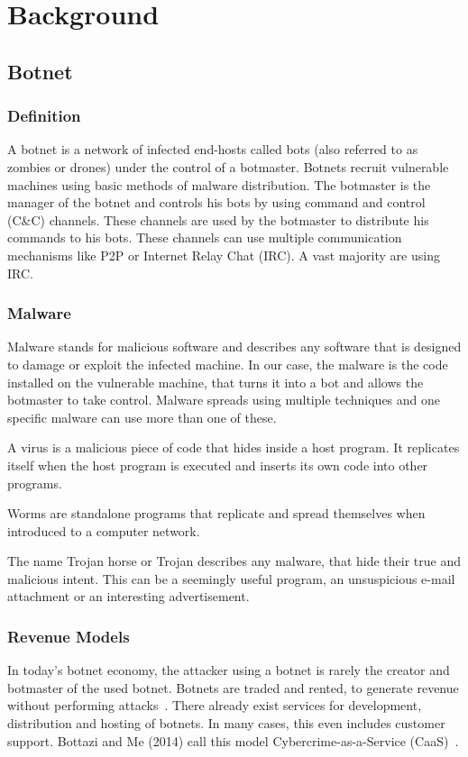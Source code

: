 \section{Background}
\subsection{Botnet}
\subsubsection{Definition}
A botnet is a network of infected end-hosts called bots (also referred to as zombies or drones) under the control of a botmaster.
Botnets recruit vulnerable machines using basic methods of malware distribution.
The botmaster is the manager of the botnet and controls his bots by using command and control (C\&C) channels.
These channels are used by the botmaster to distribute his commands to his bots.
These channels can use multiple communication mechanisms like P2P or Internet Relay Chat (IRC).
A vast majority are using IRC.\cite{AbuRajab06}

\subsubsection{Malware}
Malware stands for malicious software and describes any software that is designed to damage or exploit the infected machine.
In our case, the malware is the code installed on the vulnerable machine, that turns it into a bot and allows the botmaster to take control.
Malware spreads using multiple techniques and one specific malware can use more than one of these.

A virus is a malicious piece of code that hides inside a host program.
It replicates itself when the host program is executed and inserts its own code into other programs.

Worms are standalone programs that replicate and spread themselves when introduced to a computer network.

The name Trojan horse or Trojan describes any malware, that hide their true and malicious intent.
This can be a seemingly useful program, an unsuspicious e-mail attachment or an interesting advertisement.


\subsubsection{Revenue Models}
In today's botnet economy, the attacker using a botnet is rarely the creator and botmaster of the used botnet.
Botnets are traded and rented, to generate revenue without performing attacks~\cite{Li09}.
There already exist services for development, distribution and hosting of botnets.
In many cases, this even includes customer support.
Bottazi and Me (2014) call this model Cybercrime-as-a-Service (CaaS)~\cite{Bottazzi14}.

